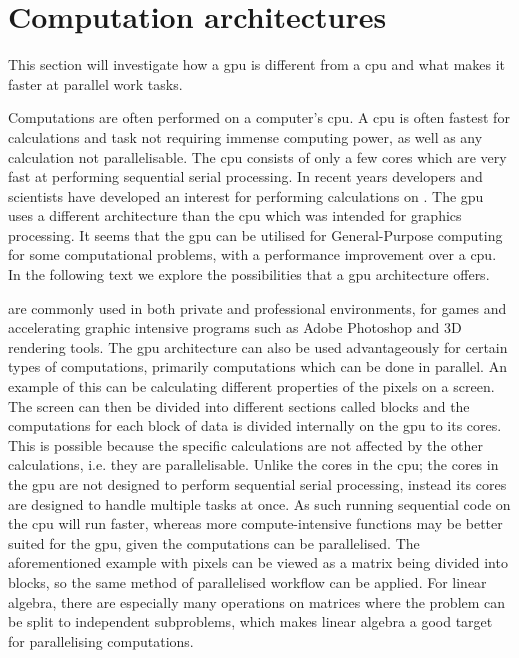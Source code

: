 \section{Computation architectures}
\label{sec:comparch}
This section will investigate how a \acrshort{gpu} is different from a \acrshort{cpu} and what makes it faster at parallel work tasks.

Computations are often performed on a computer's  \acrshort{cpu}.
A \acrshort{cpu} is often fastest for calculations and task not requiring immense computing power, as well as any calculation not parallelisable.
The \acrshort{cpu} consists of only a few cores which are very fast at performing sequential serial processing. \citep{whatisgpu} 
In recent years developers and scientists have developed an interest for performing calculations on  . \citep{gpurise}
The \acrshort{gpu} uses a different architecture than the \acrshort{cpu} which was intended for graphics processing. 
It seems that the \acrshort{gpu} can be utilised for General-Purpose computing for some computational problems, with a performance improvement over a \acrshort{cpu}.
In the following text we explore the possibilities that a \acrshort{gpu} architecture offers.

 are commonly used in both private and professional environments, for games and accelerating graphic intensive programs such as Adobe Photoshop and 3D rendering tools. \citep{NVIDIAADOBE,STEAMHW}
The \acrshort{gpu} architecture can also be used advantageously for certain types of computations, primarily computations which can be done in parallel. 
An example of this can be calculating different properties of the pixels on a screen. 
The screen can then be divided into different sections called blocks and the computations for each block of data is divided internally on the \acrshort{gpu} to its cores. 
This is possible because the specific calculations are not affected by the other calculations, i.e. they are parallelisable.
Unlike the cores in the \acrshort{cpu}; the cores in the \acrshort{gpu} are not designed to perform sequential serial processing, instead its cores are designed to handle multiple tasks at once. 
As such running sequential code on the \acrshort{cpu} will run faster, whereas more compute-intensive functions may be better suited for the \acrshort{gpu}, given the computations can be parallelised. \citep{NvidiaGPGPU}
The aforementioned example with pixels can be viewed as a matrix being divided into blocks, so the same method of parallelised workflow can be applied.
For linear algebra, there are especially many operations on matrices where the problem can be split to independent subproblems, which makes linear algebra a good target for parallelising computations.

